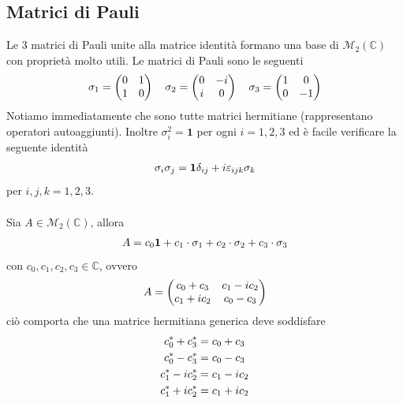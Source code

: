 \documentclass{article}
\begin{document}
\subsection{Matrici di Pauli}
Le 3 matrici di Pauli unite alla matrice identità formano una base di $\mathcal{M}_2(\mathbb{C})$ con proprietà molto utili. Le matrici di Pauli sono le seguenti
\begin{gather}
    \sigma_1 = \begin{pmatrix}
        0 & 1 \\
        1 & 0
    \end{pmatrix} \quad
    \sigma_2 = \begin{pmatrix}
        0 & -i \\
        i & 0
    \end{pmatrix} \quad
    \sigma_3 = \begin{pmatrix}
        1 & 0 \\
        0 & -1
    \end{pmatrix} \notag
\end{gather}
Notiamo immediatamente che sono tutte matrici hermitiane (rappresentano operatori autoaggiunti). Inoltre $\sigma_i^2 = \mathbf{1}$ per ogni $i = 1, 2, 3$ ed è facile verificare la seguente identità
\begin{gather}
    \sigma_i \sigma_j = \mathbf{1} \delta_{ij} + i\varepsilon_{ijk}\sigma_k \notag
\end{gather}
per $i,j,k = 1, 2, 3$. \\ \\
Sia $A \in \mathcal{M}_2(\mathbb{C})$, allora
\begin{gather}
    A = c_0 \mathbf{1} + c_1 \cdot \sigma_1 + c_2 \cdot \sigma_2 + c_3 \cdot \sigma_3 \notag
\end{gather}
con $c_0, c_1, c_2, c_3 \in \mathbb{C}$, ovvero
\begin{gather}
    A = \begin{pmatrix}
        c_0 + c_3 & c_1 - ic_2 \\
        c_1 + ic_2 & c_0 - c_3
    \end{pmatrix} \notag
\end{gather}
ciò comporta che una matrice hermitiana generica deve soddisfare
\begin{gather}
    c_0^* + c_3^* = c_0 + c_3 \notag \\
    c_0^* - c_3^* = c_0 - c_3 \notag \\
    c_1^* - ic_2^* = c_1 - ic_2 \notag \\
    c_1^* + ic_2^* = c_1 + ic_2 \notag
\end{gather}
\end{document}
